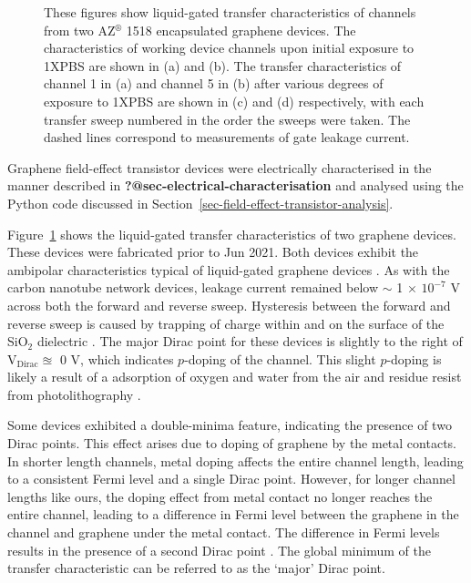 \documentclass[
  a4paper,
]{scrbook}
\begin{document}
\begin{figure}
\begin{minipage}[t]{0.47\linewidth}
{{}

}

\subcaption{\label{fig-graphene-transfer-comparison-2}}
\end{minipage}%

\caption{\label{fig-pristine-graphene}These figures show liquid-gated
transfer characteristics of channels from two AZ\(^\circledR\) 1518
encapsulated graphene devices. The characteristics of working device
channels upon initial exposure to 1XPBS are shown in (a) and (b). The
transfer characteristics of channel 1 in (a) and channel 5 in (b) after
various degrees of exposure to 1XPBS are shown in (c) and (d)
respectively, with each transfer sweep numbered in the order the sweeps
were taken. The dashed lines correspond to measurements of gate leakage
current.}

\end{figure}

Graphene field-effect transistor devices were electrically characterised
in the manner described in \textbf{?@sec-electrical-characterisation}
and analysed using the Python code discussed in
Section~\ref{sec-field-effect-transistor-analysis}.

Figure~\ref{fig-pristine-graphene} shows the liquid-gated transfer
characteristics of two graphene devices. These devices were fabricated
prior to Jun 2021. Both devices exhibit the ambipolar characteristics
typical of liquid-gated graphene devices
\autocite{Heller2009a,Heller2010,Xia2010,Kireev2017}. As with the carbon
nanotube network devices, leakage current remained below \(\sim\) 1
\(\times\) \(10^{-7}\) V across both the forward and reverse sweep.
Hysteresis between the forward and reverse sweep is caused by trapping
of charge within and on the surface of the SiO\(_{2}\) dielectric
\autocite{Bartolomeo2011}. The major Dirac point for these devices is
slightly to the right of V\(_{\textrm{Dirac}} \approxeq\) 0 V, which
indicates \(p\)-doping of the channel. This slight \(p\)-doping is
likely a result of a adsorption of oxygen and water from the air and
residue resist from photolithography
\autocite{Cheng2011,Shin2012,Kireev2017}.

Some devices exhibited a double-minima feature, indicating the presence
of two Dirac points. This effect arises due to doping of graphene by the
metal contacts. In shorter length channels, metal doping affects the
entire channel length, leading to a consistent Fermi level and a single
Dirac point. However, for longer channel lengths like ours, the doping
effect from metal contact no longer reaches the entire channel, leading
to a difference in Fermi level between the graphene in the channel and
graphene under the metal contact. The difference in Fermi levels results
in the presence of a second Dirac point
\autocite{Bartolomeo2011,Feng2014,Peng2018}. The global minimum of the
transfer characteristic can be referred to as the `major' Dirac point.
\end{document}
